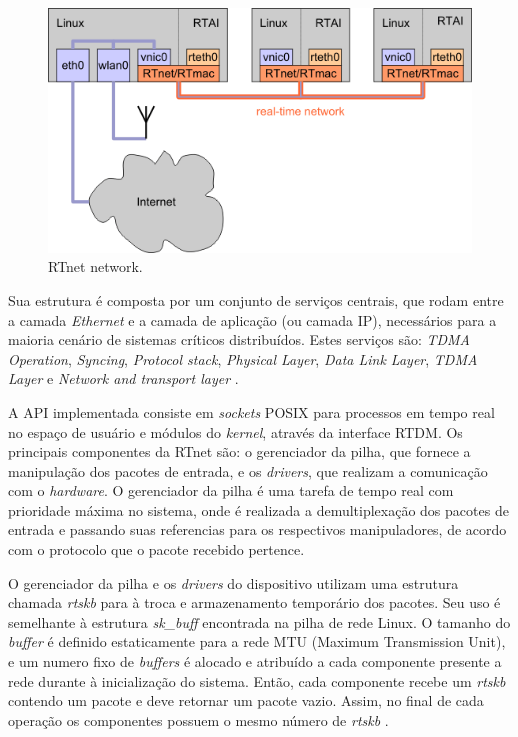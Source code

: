 \documentclass[conference]{IEEEtran}
\begin{document}
\begin{figure}[h]
	\centering
	\includegraphics[scale=0.33]{files/rtnet_network.png}
	\caption{RTnet network.  \cite{rtnet_org}}
	\label{fig:rtnetnetwork}
\end{figure}

Sua estrutura é composta por um conjunto de serviços centrais, que rodam entre a camada \textit{Ethernet} e a camada de aplicação (ou camada IP), necessários para a maioria cenário de sistemas críticos distribuídos. Estes serviços são: \textit{TDMA Operation}, \textit{Syncing}, \textit{Protocol stack}, \textit{Physical Layer}, \textit{Data Link Layer}, \textit{TDMA Layer} e \textit{Network and transport layer} \cite{rt_net_IEEE_so53551}.


A API implementada consiste em \textit{sockets} POSIX para processos em tempo real no espaço de usuário e módulos do \textit{kernel}, através da interface RTDM. Os principais componentes da RTnet são: o gerenciador da pilha, que fornece a manipulação dos pacotes de entrada, e os \textit{drivers}, que realizam a comunicação com o \textit{hardware}. O gerenciador da pilha é uma tarefa de tempo real com prioridade máxima no sistema, onde é realizada a demultiplexação dos pacotes de entrada e passando suas referencias para os respectivos manipuladores, de acordo com o protocolo que o pacote recebido pertence.

O gerenciador da pilha e os \textit{drivers} do dispositivo utilizam uma estrutura chamada \textit{rtskb} para à troca e armazenamento temporário dos pacotes. Seu uso é semelhante à estrutura \textit{sk\_buff} encontrada na pilha de rede Linux. O tamanho do \textit{buffer} é definido estaticamente para a rede MTU (Maximum Transmission Unit), e um numero fixo de \textit{buffers} é alocado e atribuído a cada componente presente a rede durante à inicialização do sistema. Então, cada componente recebe um \textit{rtskb} contendo um pacote e deve retornar um pacote vazio. Assim, no final de cada operação os componentes possuem o mesmo número de \textit{rtskb} \cite{Benvenuti_linux_net}.
\end{document}
